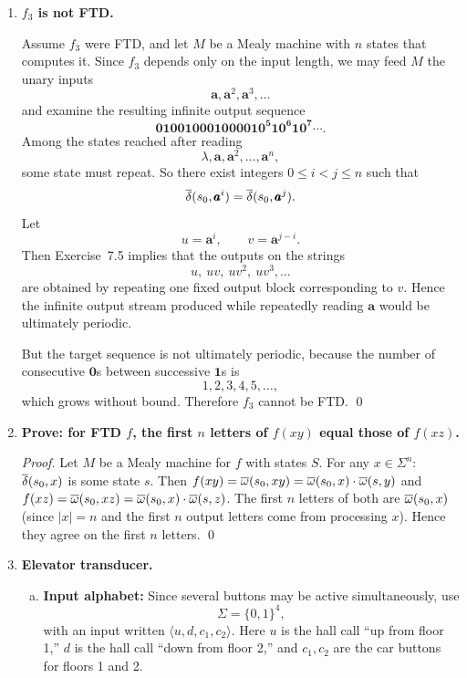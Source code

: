 \begin{enumerate}[{7.}1.]
\begin{enumerate}[(a)]
  Take $x=\pmb{0}^n$.  Then
  \[
    f_2(\pmb{0}^n\pmb{0})=\pmb{n}^{n+1},
    \qquad
    f_2(\pmb{0}^n\pmb{1})=\pmb{y}^{n+1}.
  \]
  These two input strings agree on their first $n$ letters, but the first $n$
  letters of the outputs are completely different.  This contradicts
  Exercise~7.36.  Therefore $f_2$ is not FTD. \qed
\end{enumerate}

\item \textbf{$f_3$ is not FTD.}

Assume $f_3$ were FTD, and let $M$ be a Mealy machine with $n$ states that
computes it.  Since $f_3$ depends only on the input length, we may feed $M$ the
unary inputs
\[
  \pmb{a},\pmb{a}^2,\pmb{a}^3,\ldots
\]
and examine the resulting infinite output sequence
\[
  \pmb{010010001000010^5 10^6 10^7\cdots}.
\]
Among the states reached after reading
\[
  \lambda,\pmb{a},\pmb{a}^2,\ldots,\pmb{a}^n,
\]
some state must repeat.  So there exist integers $0\le i<j\le n$ such that
\[
  \overline{\delta}(s_0,\pmb{a}^i)=\overline{\delta}(s_0,\pmb{a}^j).
\]
Let
\[
  u=\pmb{a}^i,\qquad v=\pmb{a}^{j-i}.
\]
Then Exercise~7.5 implies that the outputs on the strings
\[
  u,\ uv,\ uv^2,\ uv^3,\ldots
\]
are obtained by repeating one fixed output block corresponding to $v$.  Hence
the infinite output stream produced while repeatedly reading $\pmb{a}$ would be
ultimately periodic.

But the target sequence is not ultimately periodic, because the number of
consecutive $\pmb{0}$s between successive $\pmb{1}$s is
\[
  1,2,3,4,5,\ldots,
\]
which grows without bound.  Therefore $f_3$ cannot be FTD. \qed

\item \textbf{Prove: for FTD $f$, the first $n$ letters of $f(xy)$ equal those of $f(xz)$.}

\begin{proof}
Let $M$ be a Mealy machine for $f$ with states $S$.  For any $x\in\Sigma^n$:
$\overline{\delta}(s_0,x)$ is some state $s$.  Then $f(xy)=\overline{\omega}(s_0,xy)=\overline{\omega}(s_0,x)\cdot\overline{\omega}(s,y)$ and $f(xz)=\overline{\omega}(s_0,xz)=\overline{\omega}(s_0,x)\cdot\overline{\omega}(s,z)$.  The first $n$ letters of both are $\overline{\omega}(s_0,x)$ (since $|x|=n$ and the first $n$ output letters come from processing $x$).  Hence they agree on the first $n$ letters. \qed
\end{proof}

\item \textbf{Elevator transducer.}

\begin{enumerate}[(a)]
  \item \textbf{Input alphabet:}  Since several buttons may be active
  simultaneously, use
  \[
    \Sigma=\{0,1\}^4,
  \]
  with an input written $\langle u,d,c_1,c_2\rangle$.  Here $u$ is the hall call
  ``up from floor 1,'' $d$ is the hall call ``down from floor 2,'' and
  $c_1,c_2$ are the car buttons for floors 1 and 2.


\end{enumerate}
\end{enumerate}
